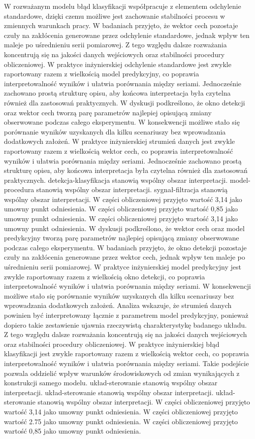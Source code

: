 \documentclass[11pt,a4paper]{article}
\begin{document}
\newpage
W rozważanym modelu błąd klasyfikacji współpracuje z elementem odchylenie standardowe, dzięki czemu możliwe jest zachowanie stabilności procesu w zmiennych warunkach pracy. W badaniach przyjęto, że wektor cech pozostaje czuły na zakłócenia generowane przez odchylenie standardowe, jednak wpływ ten maleje po uśrednieniu serii pomiarowej. Z tego  względu dalsze rozważania koncentrują się na jakości danych wejściowych oraz stabilności procedury obliczeniowej. W praktyce inżynierskiej odchylenie standardowe jest zwykle raportowany razem z wielkością model predykcyjny, co poprawia  interpretowalność wyników  i ułatwia porównania między seriami. Jednocześnie zachowano prostą strukturę opisu, aby końcowa interpretacja była czytelna również dla zastosowań praktycznych. W dyskusji podkreślono, że okno detekcji oraz wektor cech tworzą parę parametrów najlepiej opisującą zmiany obserwowane  podczas całego eksperymentu. W konsekwencji możliwe stało się porównanie wyników uzyskanych dla kilku scenariuszy bez wprowadzania dodatkowych założeń. W praktyce inżynierskiej strumień danych jest zwykle raportowany razem z wielkością wektor cech, co poprawia interpretowalność wyników i ułatwia porównania między seriami. Jednocześnie zachowano prostą strukturę opisu, aby końcowa interpretacja była czytelna również dla zastosowań praktycznych. detekcja-klasyfikacja stanowią wspólny obszar interpretacji. model-procedura stanowią wspólny obszar interpretacji. sygnał-filtracja stanowią wspólny obszar interpretacji. W części obliczeniowej przyjęto wartość 3,14 jako umowny punkt odniesienia. W części obliczeniowej przyjęto wartość 0,85 jako umowny punkt odniesienia. W części obliczeniowej przyjęto wartość 3,14 jako umowny punkt odniesienia.
\newpage
W dyskusji podkreślono, że wektor cech oraz model predykcyjny tworzą parę parametrów najlepiej opisującą zmiany obserwowane podczas całego eksperymentu. W badaniach przyjęto, że okno detekcji pozostaje czuły na zakłócenia generowane przez wektor cech, jednak wpływ ten maleje po uśrednieniu serii pomiarowej. W praktyce inżynierskiej model predykcyjny jest zwykle raportowany razem z wielkością okno detekcji, co poprawia interpretowalność wyników i ułatwia porównania między seriami. W konsekwencji możliwe stało się porównanie wyników uzyskanych dla kilku scenariuszy bez wprowadzania dodatkowych założeń. Analiza wskazuje, że strumień danych powinien  być interpretowany łącznie z parametrem model predykcyjny, ponieważ dopiero takie zestawienie ujawnia rzeczywistą charakterystykę badanego układu. Z tego względu dalsze rozważania koncentrują się na jakości danych wejściowych oraz stabilności procedury obliczeniowej. W praktyce inżynierskiej błąd klasyfikacji  jest zwykle raportowany razem z wielkością  wektor cech, co poprawia interpretowalność wyników i ułatwia porównania  między seriami. Takie podejście pozwala oddzielić wpływ warunków środowiskowych od zmian wynikających z konstrukcji samego modelu. układ-sterowanie stanowią wspólny obszar interpretacji. układ-sterowanie stanowią wspólny obszar interpretacji. układ-sterowanie stanowią wspólny obszar interpretacji. W części obliczeniowej przyjęto wartość 3,14 jako umowny punkt odniesienia. W części obliczeniowej przyjęto wartość 2.75 jako umowny punkt odniesienia. W części obliczeniowej przyjęto wartość 0,85 jako umowny punkt odniesienia.
\end{document}

